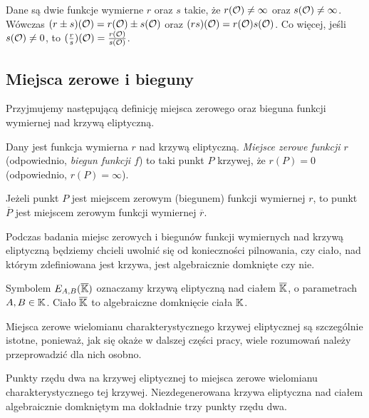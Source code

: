 \begin{lemma}
Dane są dwie funkcje wymierne $r$ oraz $s$ takie,
że $r(\mathcal{O}) \neq \infty$ oraz $s(\mathcal{O}) \neq \infty$.
Wówczas $(r \pm s)(\mathcal{O}) = r(\mathcal{O}) \pm s(\mathcal{O})$
oraz $(rs)(\mathcal{O}) = r(\mathcal{O})s(\mathcal{O})$.
Co więcej, jeśli $s(\mathcal{O}) \neq 0$,
to $(\frac{r}{s})(\mathcal{O}) = \frac{r(\mathcal{O})}{s(\mathcal{O})}$.
\end{lemma}

\subsection*{Miejsca zerowe i bieguny}

Przyjmujemy następującą definicję
miejsca zerowego oraz bieguna funkcji wymiernej nad krzywą eliptyczną.

\begin{definition}
Dany jest funkcja wymierna $r$ nad krzywą eliptyczną.
\emph{Miejsce zerowe funkcji $r$} (odpowiednio, \emph{biegun funkcji $f$})
to taki punkt $P$ krzywej, że $r(P) = 0$ (odpowiednio, $r(P) = \infty$).
\end{definition}

\begin{fact}
Jeżeli punkt $P$ jest miejscem zerowym (biegunem) funkcji wymiernej $r$,
to punkt $\overline{P}$ jest miejscem zerowym funkcji wymiernej $\overline{r}$.
\end{fact}

Podczas badania miejsc zerowych i biegunów
funkcji wymiernych nad krzywą eliptyczną
będziemy chcieli uwolnić się od konieczności pilnowania,
czy ciało, nad którym zdefiniowana jest krzywa,
jest algebraicznie domknięte czy nie.

\begin{remark}
Symbolem $E_{A,B}(\overline{\mathbb{K}})$
oznaczamy krzywą eliptyczną nad ciałem $\overline{\mathbb{K}}$,
o parametrach $A, B \in \mathbb{K}$.
Ciało $\overline{\mathbb{K}}$ to algebraiczne domknięcie ciała $\mathbb{K}$.
\end{remark}

Miejsca zerowe wielomianu charakterystycznego krzywej eliptycznej
są szczególnie istotne,
ponieważ, jak się okaże w dalszej części pracy,
wiele rozumowań należy przeprowadzić dla nich osobno.

\begin{fact}
Punkty rzędu dwa na krzywej eliptycznej
to miejsca zerowe wielomianu charakterystycznego tej krzywej.
Niezdegenerowana krzywa eliptyczna nad ciałem algebraicznie domkniętym
ma dokładnie trzy punkty rzędu dwa.
\end{fact}

